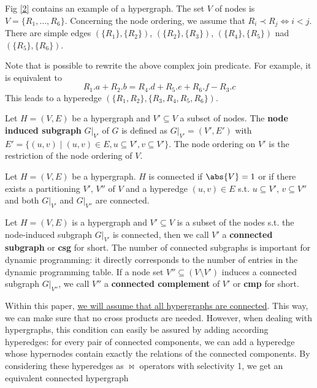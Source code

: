 \documentclass[11pt]{article}
\begin{document}
Fig \ref{2} contains an example of a hypergraph. The set \(V\) of nodes is \(V=\{R_1,\dots,R_6\}\). Concerning the node ordering, we assume that
\(R_i\prec R_j\Leftrightarrow i<j\). There are simple edges \((\{R_1\},\{R_2\})\),
\((\{R_2\},\{R_3\})\), \((\{R_4\},\{R_5\})\) nad \((\{R_5\},\{R_6\})\).

Note that is possible to rewrite the above complex join predicate. For example, it is equivalent to
\begin{equation*}
R_1.a+R_2.b=R_4.d+R_5.e+R_6.f-R_3.c
\end{equation*}
This leads to a hyperedge \((\{R_1,R_2\},\{R_3,R_4,R_5,R_6\})\).

\begin{definition}[Subgraph]
Let \(H=(V,E)\) be a hypergraph and \(V'\subseteq V\) a subset of nodes. The \textbf{node induced subgraph}
\(G|_{V'}\) of \(G\) is defined as \(G|_{V'}=(V',E')\) with \(E'=\{(u,v)\mid (u,v)\in E,u\subseteq
        V',v\subseteq V'\}\).
The node ordering on \(V'\) is the restriction of the node ordering of \(V\).
\end{definition}

\begin{definition}[Connected]
Let \(H=(V,E)\) be a hypergraph. \(H\) is connected if \(\abs{V}=1\) or if there exists a partitioning
\(V'\), \(V''\) of \(V\) and a hyperedge \((u,v)\in E\) s.t. \(u\subseteq V'\), \(v\subseteq V''\) and
both \(G|_{V'}\) and \(G|_{V''}\) are connected.
\end{definition}

Let \(H=(V,E)\) is a hypergraph and \(V'\subseteq V\) is a subset of the nodes s.t. the node-induced
subgraph \(G|_{V'}\) is connected, then we call \(V'\) a \textbf{connected subgraph} or \textbf{csg} for short. The
number of connected subgraphs is important for dynamic programming: it directly corresponds to the
number of entries in the dynamic programming table. If a node set \(V''\subseteq(V\setminus V')\)
induces a connected subgraph \(G|_{V''}\), we call \(V''\) a \textbf{connected complement} of \(V'\) or \textbf{cmp} for
short.

Within this paper, \uline{we will assume that all hypergraphs are connected}. This way, we can make sure that
no cross products are needed. However, when dealing with hypergraphs, this condition can easily be
assured by adding according hyperedges: for every pair of connected components, we can add a hyperedge
whose hypernodes contain exactly the relations of the connected components. By considering these
hyperedges as \(\bowtie\) operators with selectivity 1, we get an equivalent connected hypergraph
\end{document}
